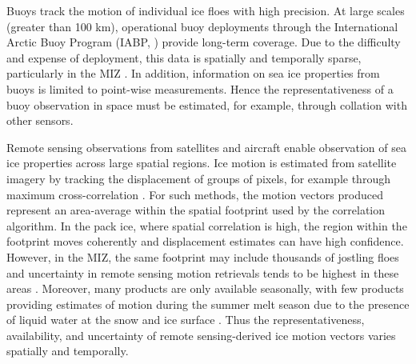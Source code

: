\documentclass[aog]{igs}
\begin{document}
Buoys track the motion of individual ice floes with high precision. 
At large scales (greater than 100 km), operational buoy deployments through the International Arctic Buoy Program (IABP, \cite{rigor2008}) provide long-term coverage. 
Due to the difficulty and expense of deployment, this data is spatially and temporally sparse, particularly in the MIZ \citep{gerland2019_EssentialGaps, brunette2022_NewStatedependent}.
In addition, information on sea ice properties from buoys is limited to point-wise measurements.
Hence the representativeness of a buoy observation in space must be estimated, for example, through collation with other sensors.

Remote sensing observations from satellites and aircraft enable observation of sea ice properties across large spatial regions.
Ice motion is estimated from satellite imagery by tracking the displacement of groups of pixels, for example through maximum cross-correlation \citep{girard-ardhuin2012_EnhancedArctic, lavergne2010_SeaIce}.
For such methods, the motion vectors produced represent an area-average within the spatial footprint used by the correlation algorithm.
In the pack ice, where spatial correlation is high, the region within the footprint moves coherently and displacement estimates can have high confidence. However, in the MIZ, the same footprint may include thousands of jostling floes and uncertainty in remote sensing motion retrievals tends to be highest in these areas \citep{sumata2014_IntercomparisonArctic, gui2020_ValidationRemotesensing}.
Moreover, many products are only available seasonally, with few products providing estimates of motion during the summer melt season due to the presence of liquid water at the snow and ice surface \citep{lavergne2010_SeaIce, girard-ardhuin2012_EnhancedArctic}. 
Thus the representativeness, availability, and uncertainty of remote sensing-derived ice motion vectors varies spatially and temporally.
\end{document}
